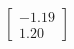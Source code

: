 \documentclass[preview]{standalone}
\begin{document}
\begin{align*}
\begin{bmatrix} -1.19 \\ 1.20 \end{bmatrix}
\end{align*}
\end{document}
